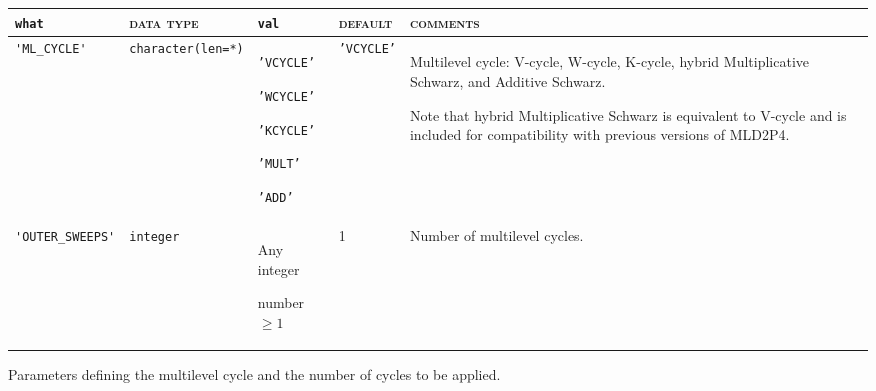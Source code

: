 \bsideways
\begin{center}
\begin{tabular}{|p{3.6cm}|l|p{2.4cm}|p{2.4cm}|p{7.2cm}|}
\hline
\verb|what|              & \textsc{data type}        &  \verb|val|      &  \textsc{default}  &
\textsc{comments} \\ \hline
\verb|'ML_CYCLE'|     & \verb|character(len=*)|
                         & \texttt{'VCYCLE'} \par \texttt{'WCYCLE'}   \par \texttt{'KCYCLE'} \par
                             \texttt{'MULT'} \par \texttt{'ADD'}
                         & \texttt{'VCYCLE'}
                         &Multilevel cycle: V-cycle, W-cycle, K-cycle, hybrid Multiplicative Schwarz,
                           and Additive Schwarz. \par
                           Note that hybrid Multiplicative Schwarz is equivalent to V-cycle and
                           is included for compatibility with previous versions of MLD2P4. \\ \hline
 \verb|'OUTER_SWEEPS'| & \texttt{integer} &
                           Any integer \par number $\ge 1$  & 1 &
                           Number of multilevel cycles. \\ \hline
\end{tabular}
\end{center}
\caption{Parameters defining the multilevel cycle and the number of cycles to
be applied.
\label{tab:p_cycle}}                       
\esideways
                   
